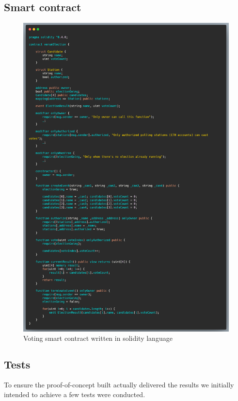 \subsection{Smart contract}

\begin{figure}[H]
	\centering
		\includegraphics[width=12cm]{images/chapter3/smart-contract.png}
		\caption{{\footnotesize Voting smart contract written in solidity language}}
\end{figure}

\subsection{Tests}
To ensure the proof-of-concept built actually delivered the results we initially intended to achieve a few tests were conducted.


